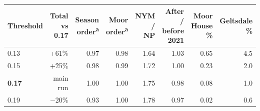 \begin{tabular}{lrrrrrrr}
\toprule
Threshold & \makecell[r]{Total\\vs 0.17} & \makecell[r]{Season\\order\textsuperscript{a}} & \makecell[r]{Moor\\order\textsuperscript{a}} & \makecell[r]{NYM /\\NP} & \makecell[r]{After /\\before 2021} & \makecell[r]{Moor\\House \%} & \makecell[r]{Geltsdale\\\%} \\
\midrule
0.13 & +61\% & 0.97 & 0.98 & 1.64 & 1.03 & 0.65 & 4.5 \\
0.15 & +25\% & 0.98 & 0.99 & 1.72 & 1.00 & 0.23 & 2.0 \\
\textbf{0.17} & main run & 1.00 & 1.00 & 1.75 & 0.98 & 0.08 & 1.0 \\
0.19 & $-$20\% & 0.93 & 1.00 & 1.78 & 0.97 & 0.02 & 0.6 \\
\bottomrule
\end{tabular}
